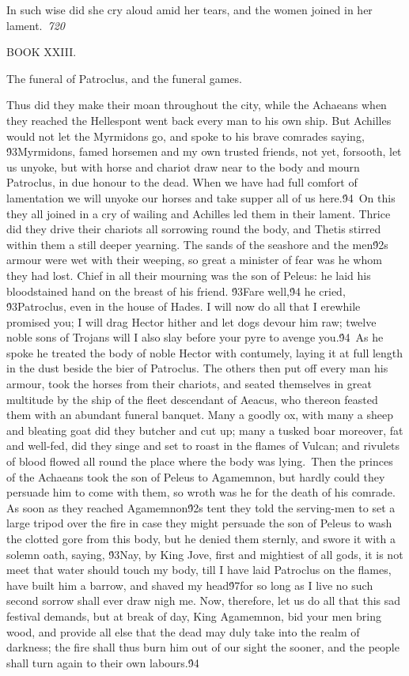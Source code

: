 {In such wise did she cry aloud amid her tears, and the women joined in her lament.\
\pard{}\sl720\qc{}

  BOOK XXIII.\
\pard{}\qj{}

  The funeral of Patroclus, and the funeral games.\
\pard{}\qj{}

\fs24 \cf2 Thus did they make their moan throughout the city, while the Achaeans when they reached the Hellespont went back every man to his own ship. But Achilles would not let the Myrmidons go, and spoke to his brave comrades saying, \'93Myrmidons, famed horsemen and my own trusted friends, not yet, forsooth, let us unyoke, but with horse and chariot draw near to the body and mourn Patroclus, in due honour to the dead. When we have had full comfort of lamentation we will unyoke our horses and take supper all of us here.\'94\
On this they all joined in a cry of wailing and Achilles led them in their lament. Thrice did they drive their chariots all sorrowing round the body, and Thetis stirred within them a still deeper yearning. The sands of the seashore and the men\'92s armour were wet with their weeping, so great a minister of fear was he whom they had lost. Chief in all their mourning was the son of Peleus: he laid his bloodstained hand on the breast of his friend. \'93Fare well,\'94 he cried, \'93Patroclus, even in the house of Hades. I will now do all that I erewhile promised you; I will drag Hector hither and let dogs devour him raw; twelve noble sons of Trojans will I also slay before your pyre to avenge you.\'94\
As he spoke he treated the body of noble Hector with contumely, laying it at full length in the dust beside the bier of Patroclus. The others then put off every man his armour, took the horses from their chariots, and seated themselves in great multitude by the ship of the fleet descendant of Aeacus, who thereon feasted them with an abundant funeral banquet. Many a goodly ox, with many a sheep and bleating goat did they butcher and cut up; many a tusked boar moreover, fat and well-fed, did they singe and set to roast in the flames of Vulcan; and rivulets of blood flowed all round the place where the body was lying.\
Then the princes of the Achaeans took the son of Peleus to Agamemnon, but hardly could they persuade him to come with them, so wroth was he for the death of his comrade. As soon as they reached Agamemnon\'92s tent they told the serving-men to set a large tripod over the fire in case they might persuade the son of Peleus to wash the clotted gore from this body, but he denied them sternly, and swore it with a solemn oath, saying, \'93Nay, by King Jove, first and mightiest of all gods, it is not meet that water should touch my body, till I have laid Patroclus on the flames, have built him a barrow, and shaved my head\'97for so long as I live no such second sorrow shall ever draw nigh me. Now, therefore, let us do all that this sad festival demands, but at break of day, King Agamemnon, bid your men bring wood, and provide all else that the dead may duly take into the realm of darkness; the fire shall thus burn him out of our sight the sooner, and the people shall turn again to their own labours.\'94\
}
